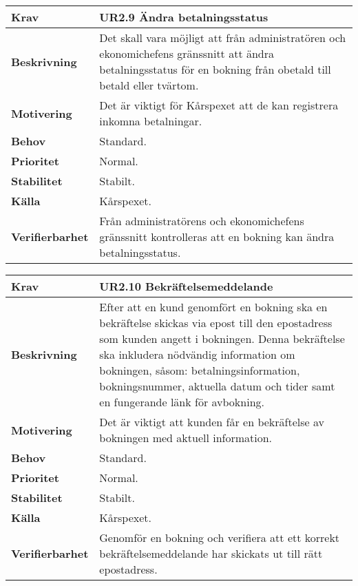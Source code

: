 \documentclass[a4paper, twoside, 11pt, titlepage]{article}
\begin{document}
		\begin{tabular} { p{2.6cm} p{12.5cm} }
			\hline
			\sffamily\textbf{Krav} & \sffamily\textbf{UR2.9 Ändra betalningsstatus  } \\
			\hline
			\sffamily\textbf{Beskrivning} & Det skall vara möjligt att från administratören och ekonomichefens gränssnitt att ändra betalningsstatus för en bokning från obetald till betald eller tvärtom.  \\
			\hline
			\sffamily\textbf{Motivering} & Det är viktigt för Kårspexet att de kan registrera inkomna betalningar.  \\
			\hline
			\sffamily\textbf{Behov} & Standard.  \\
			\hline
			\sffamily\textbf{Prioritet} & Normal.  \\
			\hline
			\sffamily\textbf{Stabilitet} & Stabilt.  \\
			\hline
			\sffamily\textbf{Källa} & Kårspexet.  \\
			\hline
			\sffamily\textbf{Verifierbarhet} & Från administratörens och ekonomichefens gränssnitt kontrolleras att en bokning kan ändra betalningsstatus.  \\
			\hline
		\end{tabular}
		\vspace{6mm}

		\begin{tabular} { p{2.6cm} p{12.5cm} }
			\hline
			\sffamily\textbf{Krav} & \sffamily\textbf{UR2.10 Bekräftelsemeddelande  } \\
			\hline
			\sffamily\textbf{Beskrivning} & Efter att en kund genomfört en bokning ska en bekräftelse skickas via epost till den epostadress som kunden angett i bokningen. Denna bekräftelse ska inkludera nödvändig information om bokningen, såsom: betalningsinformation, bokningsnummer, aktuella datum och tider samt en fungerande länk för avbokning.  \\
			\hline
			\sffamily\textbf{Motivering} & Det är viktigt att kunden får en bekräftelse av bokningen med aktuell information.  \\
			\hline
			\sffamily\textbf{Behov} & Standard.  \\
			\hline
			\sffamily\textbf{Prioritet} & Normal.  \\
			\hline
			\sffamily\textbf{Stabilitet} & Stabilt.  \\
			\hline
			\sffamily\textbf{Källa} & Kårspexet.  \\
			\hline
			\sffamily\textbf{Verifierbarhet} & Genomför en bokning och verifiera att ett korrekt bekräftelsemeddelande har skickats ut till rätt epostadress.  \\
			\hline
		\end{tabular}
		\vspace{6mm}
\end{document}
